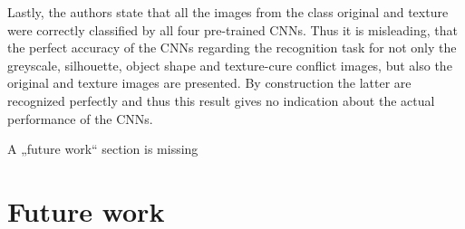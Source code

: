 \documentclass[runningheads,a4paper]{llncs}
\begin{document}
Lastly, the authors state that all the images from the class original and texture were correctly classified by all four pre-trained CNNs. Thus it is misleading, that the perfect accuracy of the CNNs regarding the recognition task for not only the greyscale, silhouette, object shape and texture-cure conflict images, but also the original and texture images are presented. By construction the latter are recognized perfectly and thus this result gives no indication about the actual performance of the CNNs.

%
%
%
%
%
%

A „future work“ section is missing\\

\section{Future work}
\end{document}
